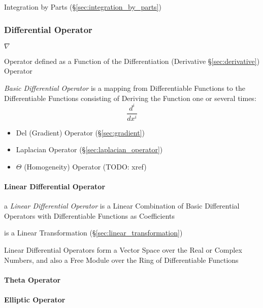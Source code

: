 \fist Integration by Parts (\S\ref{sec:integration_by_parts})



\subsubsection{Differential Operator}\label{sec:differential_operator}

$\nabla$

Operator defined as a Function of the Differentiation (Derivative
\S\ref{sec:derivative}) Operator

\emph{Basic Differential Operator} is a mapping from Differentiable Functions
to the Differentiable Functions consisting of Deriving the Function one or
several times:
\[
  \frac{d^i}{dx^i}
\]

\begin{itemize}
  \item Del (Gradient) Operator (\S\ref{sec:gradient})
  \item Laplacian Operator (\S\ref{sec:laplacian_operator})
  \item $\Theta$ (Homogeneity) Operator (TODO: xref)
\end{itemize}



\paragraph{Linear Differential Operator}
\label{sec:linear_differential_operator}\hfill

a \emph{Linear Differential Operator} is a Linear Combination of Basic
Differential Operators with Differentiable Functions as Coefficients

is a Linear Transformation (\S\ref{sec:linear_transformation})

Linear Differential Operators form a Vector Space over the Real or Complex
Numbers, and also a Free Module over the Ring of Differentiable Functions



\paragraph{Theta Operator}\label{sec:theta_operator}\hfill

\paragraph{Elliptic Operator}\label{sec:elliptic_operator}\hfill

